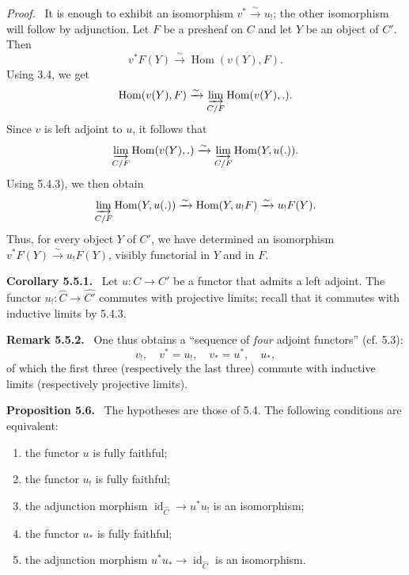 \documentclass[11pt]{article}
\newcommand{\Hom}{\operatorname{Hom}}
\newcommand{\id}{\operatorname{id}}
\newenvironment{statement}[1]{\par\medskip\noindent\textbf{#1.}\ }{\par\medskip}
\newenvironment{proofsketch}{\par\noindent\emph{Proof.}\ }{\par\medskip}
\begin{document}
\begin{proofsketch}
It is enough to exhibit an isomorphism $v^*\xrightarrow{\sim}u_!$; the other isomorphism will follow by adjunction. Let $F$ be a presheaf on $C$ and let $Y$ be an object of $C'$. Then
\[
v^*F(Y)\xrightarrow{\sim}\Hom(v(Y),F).
\]
Using 3.4, we get
\[
\Hom(v(Y),F)\xrightarrow{\sim}\varinjlim_{C/F}\Hom(v(Y),.).
\]
Since $v$ is left adjoint to $u$, it follows that
\[
\varinjlim_{C/F}\Hom(v(Y),.)\xrightarrow{\sim}\varinjlim_{C/F}\Hom(Y,u(.)).
\]
Using 5.4.3), we then obtain
\[
\varinjlim_{C/F}\Hom(Y,u(.))\xrightarrow{\sim}\Hom(Y,u_!F)\xrightarrow{\sim}u_!F(Y).
\]
Thus, for every object $Y$ of $C'$, we have determined an isomorphism $v^*F(Y)\xrightarrow{\sim}u_!F(Y)$, visibly functorial in $Y$ and in $F$.
\end{proofsketch}

\begin{statement}{Corollary 5.5.1}
Let $u:C\to C'$ be a functor that admits a left adjoint. The functor $u_!:\widehat C\to\widehat{C'}$ commutes with projective limits; recall that it commutes with inductive limits by 5.4.3.
\end{statement}

\begin{statement}{Remark 5.5.2}
One thus obtains a ``sequence of \emph{four} adjoint functors'' (cf. 5.3):
\[
v_!,\quad v^*=u_!,\quad v_*=u^*,\quad u_*,
\]
of which the first three (respectively the last three) commute with inductive limits (respectively projective limits).
\end{statement}

\begin{statement}{Proposition 5.6}
The hypotheses are those of 5.4. The following conditions are equivalent:
\begin{enumerate}[label=\roman*)]
\item the functor $u$ is fully faithful;
\item the functor $u_!$ is fully faithful;
\item the adjunction morphism $\id_{\widehat C}\to u^*u_!$ is an isomorphism;
\item the functor $u_*$ is fully faithful;
\item the adjunction morphism $u^*u_*\to\id_{\widehat C}$ is an isomorphism.
\end{enumerate}
\end{statement}
\end{document}

